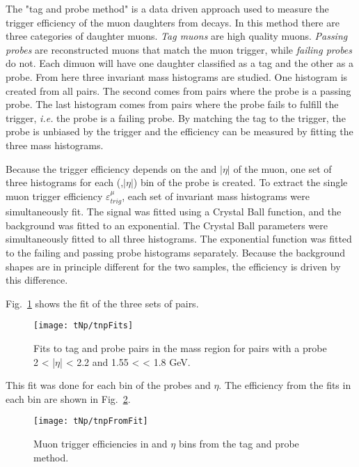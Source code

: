       The "tag and probe method" is a data driven approach used to measure the 
        trigger efficiency of the muon daughters from \JPsi{} decays.
      In this method there are three categories of daughter muons. 
      \textit{Tag muons} are high quality muons.
      \textit{Passing probes} are reconstructed muons that match the muon 
        trigger, while \textit{failing probes} do not. 
      Each dimuon will have one daughter classified as a tag and the other
        as a probe.
      From here three invariant mass histograms are studied. 
      One histogram is created from all pairs. 
      The second comes from pairs where the probe is a passing probe.  
      The last histogram comes from pairs where the probe fails to fulfill
        the trigger, \textit{i.e.} the probe is a failing probe. 
      By matching the tag to the trigger, the probe is unbiased by the trigger 
        and the  efficiency can be measured by fitting the three mass 
        histograms. 

      Because the trigger efficiency depends on the \pt{} and $|\eta|$ of the 
        muon, one set of three histograms for each (\pt{},$|\eta|$) bin of the
        probe is created.
      To extract the single muon trigger efficiency $\varepsilon^{\mu}_{trig}$, 
        each set of invariant mass histograms were simultaneously fit. 
      The signal was fitted using a Crystal Ball function, and the background 
        was fitted to an exponential.
      The Crystal Ball parameters were simultaneously fitted to all three 
        histograms.
      The exponential function was fitted to the failing and passing probe 
        histograms separately.
      Because the background shapes are in principle different for the two 
        samples, the efficiency is driven by this difference. 

      Fig.~\ref{fig:tnpFitPlot} shows the fit of the three sets of pairs. 
      \begin{figure}[!Hh]
        \centering
        \texttt{[image: tNp/tnpFits]}
        \caption{Fits to tag and probe pairs in the \JPsi{} mass region for
        pairs with a probe 2 < |$\eta$| < 2.2 and 1.55 < \pt{} < 1.8 GeV.}
        \label{fig:tnpFitPlot}
      \end{figure}
      This fit was done for each bin of the probes \pt{} and $\eta$.
      The efficiency from the fits in each bin are shown in Fig.~\ref{fig:tnpTrigMap}.
      \begin{figure}[!Hhbt]
        \centering
        \texttt{[image: tNp/tnpFromFit]}
        \caption{Muon trigger efficiencies in \pt{} and $\eta$ bins from 
          the tag and probe method.}
        \label{fig:tnpTrigMap}
      \end{figure}


